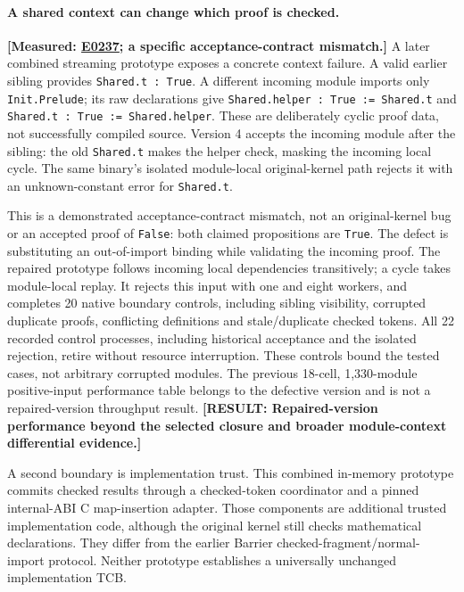 \documentclass[10pt,twocolumn]{article}
\newcommand{\missing}[1]{\textbf{[RESULT: #1]}}
\newcommand{\measured}[1]{\textbf{[Measured: #1]}}
\newcommand{\expref}[2]{\href{https://github.com/yunwei37/proofserve/blob/main/docs/tmp/build-and-evaluate/step-#1/step-report.md}{E#2}}
\begin{document}
\paragraph{A shared context can change which proof is checked.}
\measured{\expref{0237-20261101T060743+0000}{0237}; a specific acceptance-contract mismatch.}
A later combined streaming prototype exposes a concrete context failure.
A valid earlier sibling provides \texttt{Shared.t : True}.
A different incoming module imports only \texttt{Init.Prelude}; its raw
declarations give \texttt{Shared.helper : True := Shared.t} and
\texttt{Shared.t : True := Shared.helper}.
These are deliberately cyclic proof data, not successfully compiled source.
Version 4 accepts the incoming module after the sibling: the old
\texttt{Shared.t} makes the helper check, masking the incoming local cycle.
The same binary's isolated module-local original-kernel path rejects it
with an unknown-constant error for \texttt{Shared.t}.

This is a demonstrated acceptance-contract mismatch, not an original-kernel
bug or an accepted proof of \texttt{False}: both claimed propositions are
\texttt{True}. The defect is substituting an out-of-import binding while
validating the incoming proof.
The repaired prototype follows incoming local dependencies transitively;
a cycle takes module-local replay.
It rejects this input with one and eight workers, and completes 20 native
boundary controls, including sibling visibility, corrupted duplicate proofs,
conflicting definitions and stale/duplicate checked tokens.
All 22 recorded control processes, including historical acceptance and the
isolated rejection, retire without resource interruption.
These controls bound the tested cases, not arbitrary corrupted modules.
The previous 18-cell, 1,330-module positive-input performance table belongs
to the defective version and is not a repaired-version throughput result.
\missing{Repaired-version performance beyond the selected closure and
broader module-context differential evidence.}

A second boundary is implementation trust.
This combined in-memory prototype commits checked results through a
checked-token coordinator and a pinned internal-ABI C map-insertion adapter.
Those components are additional trusted implementation code, although the
original kernel still checks mathematical declarations.
They differ from the earlier Barrier checked-fragment/normal-import protocol.
Neither prototype establishes a universally unchanged implementation TCB.
\end{document}
